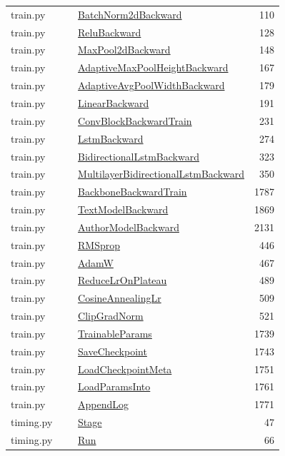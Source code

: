\documentclass[11pt,a4paper,oneside]{report}
\begin{document}
\begin{longtable}{p{0.28\linewidth}p{0.48\linewidth}r}
train.py & \hyperref[fn:train:BatchNorm2dBackward]{BatchNorm2dBackward} & 110\\
train.py & \hyperref[fn:train:ReluBackward]{ReluBackward} & 128\\
train.py & \hyperref[fn:train:MaxPool2dBackward]{MaxPool2dBackward} & 148\\
train.py & \hyperref[fn:train:AdaptiveMaxPoolHeightBackward]{AdaptiveMaxPoolHeightBackward} & 167\\
train.py & \hyperref[fn:train:AdaptiveAvgPoolWidthBackward]{AdaptiveAvgPoolWidthBackward} & 179\\
train.py & \hyperref[fn:train:LinearBackward]{LinearBackward} & 191\\
train.py & \hyperref[fn:train:ConvBlockBackwardTrain]{ConvBlockBackwardTrain} & 231\\
train.py & \hyperref[fn:train:LstmBackward]{LstmBackward} & 274\\
train.py & \hyperref[fn:train:BidirectionalLstmBackward]{BidirectionalLstmBackward} & 323\\
train.py & \hyperref[fn:train:MultilayerBidirectionalLstmBackward]{MultilayerBidirectionalLstmBackward} & 350\\
train.py & \hyperref[fn:train:BackboneBackwardTrain]{BackboneBackwardTrain} & 1787\\
train.py & \hyperref[fn:train:TextModelBackward]{TextModelBackward} & 1869\\
train.py & \hyperref[fn:train:AuthorModelBackward]{AuthorModelBackward} & 2131\\
train.py & \hyperref[fn:train:RMSprop]{RMSprop} & 446\\
train.py & \hyperref[fn:train:AdamW]{AdamW} & 467\\
train.py & \hyperref[fn:train:ReduceLrOnPlateau]{ReduceLrOnPlateau} & 489\\
train.py & \hyperref[fn:train:CosineAnnealingLr]{CosineAnnealingLr} & 509\\
train.py & \hyperref[fn:train:ClipGradNorm]{ClipGradNorm} & 521\\
train.py & \hyperref[fn:train:TrainableParams]{TrainableParams} & 1739\\
train.py & \hyperref[fn:train:SaveCheckpoint]{SaveCheckpoint} & 1743\\
train.py & \hyperref[fn:train:LoadCheckpointMeta]{LoadCheckpointMeta} & 1751\\
train.py & \hyperref[fn:train:LoadParamsInto]{LoadParamsInto} & 1761\\
train.py & \hyperref[fn:train:AppendLog]{AppendLog} & 1771\\
timing.py & \hyperref[fn:timing:Stage]{Stage} & 47\\
timing.py & \hyperref[fn:timing:Run]{Run} & 66\\
\bottomrule\end{longtable}\normalsize
\end{document}
